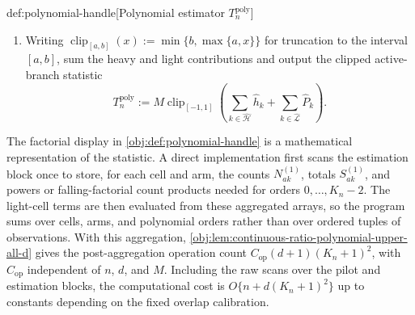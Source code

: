 \begin{algorithmv}{def:polynomial-handle}[Polynomial estimator \(T_n^{\mathrm{poly}}\)]
\begin{enumerate}
\item Writing \(\operatorname{clip}_{[a,b]}(x):=\min\{b,\max\{a,x\}\}\) for truncation to the interval \([a,b]\), sum the heavy and light contributions and output the clipped active-branch statistic
\[
T_n^{\mathrm{poly}}
:=
M\operatorname{clip}_{[-1,1]}
\left(
\sum_{k\in\widehat{\mathcal H}}\widehat h_k
+
\sum_{k\in\widehat{\mathcal L}}\widehat P_k
\right).
\]
\end{enumerate}
\end{algorithmv}

The factorial display in \cref{obj:def:polynomial-handle} is a mathematical representation of the statistic. A direct implementation first scans the estimation block once to store, for each cell and arm, the counts \(N_{ak}^{(1)}\), totals \(S_{ak}^{(1)}\), and powers or falling-factorial count products needed for orders \(0,\ldots,K_n-2\). The light-cell terms are then evaluated from these aggregated arrays, so the program sums over cells, arms, and polynomial orders rather than over ordered tuples of observations. With this aggregation, \cref{obj:lem:continuous-ratio-polynomial-upper-all-d} gives the post-aggregation operation count \(C_{\mathrm{op}}(d+1)(K_n+1)^2\), with \(C_{\mathrm{op}}\) independent of \(n\), \(d\), and \(M\). Including the raw scans over the pilot and estimation blocks, the computational cost is \(O\{n+d(K_n+1)^2\}\) up to constants depending on the fixed overlap calibration.

